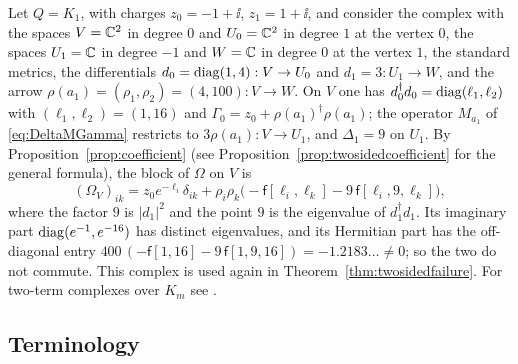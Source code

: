 \begin{example}\label{ex:nonnormal}
Let $Q=K_1$, with charges $z_0=-1+\ii$, $z_1=1+\ii$, and consider the complex
with the spaces $V=\mathbb C^2$ in degree $0$ and $U_0=\mathbb C^2$ in degree $1$ at the
vertex $0$, the spaces $U_1=\mathbb C$ in degree $-1$ and $W=\mathbb C$ in degree $0$ at
the vertex $1$, the standard metrics, the differentials
$d_0=\operatorname{diag}(1,4):V\to U_0$ and $d_1=3:U_1\to W$, and the arrow
$\rho(a_1)=(\rho_1,\rho_2)=(4,100):V\to W$. On $V$ one has
$d_0^\dagger d_0=\operatorname{diag}(\ell_1,\ell_2)$ with $(\ell_1,\ell_2)=(1,16)$ and
$\Gamma_0=z_0+\rho(a_1)^\dagger\rho(a_1)$; the operator $M_{a_1}$ of
\eqref{eq:DeltaMGamma} restricts to $3\rho(a_1):V\to U_1$, and $\Delta_1=9$
on $U_1$. By Proposition~\ref{prop:coefficient} (see
Proposition~\ref{prop:twosidedcoefficient} for the general formula), the
block of $\Omega$ on $V$ is
\[
 (\Omega_V)_{ik}=z_0e^{-\ell_i}\delta_{ik}
 +\rho_i\rho_k\bigl(-\mathsf f[\ell_i,\ell_k]-9\,\mathsf f[\ell_i,9,\ell_k]\bigr),
\]
where the factor $9$ is $|d_1|^2$ and the point $9$ is the eigenvalue of
$d_1^\dagger d_1$. Its imaginary part $\operatorname{diag}(e^{-1},e^{-16})$ has distinct
eigenvalues, and its Hermitian part has the off-diagonal entry
$400\,(-\mathsf f[1,16]-9\,\mathsf f[1,9,16])=-1.2183\ldots\neq0$; so the two
do not commute. This complex is used again in
Theorem~\ref{thm:twosidedfailure}. For two-term complexes over $K_m$ see
\cite[Example~2.3]{wue26a}.
\end{example}

\subsection{Terminology}

